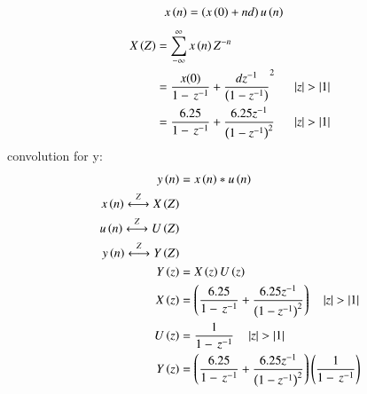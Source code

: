 \documentclass[journal,12pt,twocolumn]{IEEEtran}
\theoremstyle{remark}
\begin{document}
\begin{align}
x\left(n\right)&=\left(x\left(0\right)+nd\right)u\left(n\right)
\end{align}
\begin{align}
X\left(Z\right)&=\sum_{-\infty}^{\infty}x\left(n\right)Z^{-n}\\\
&=\frac{x(0)}{1-\,z^{-1}}+\frac{dz^{-1}}{\left(1-{z^{-1}}\right)}^2\:\:
\quad\left\vert z\right\vert>\left\vert1\right\vert\\
&=\frac{6.25}{1-\,z^{-1}}+\frac{6.25z^{-1}}{\left(1-{z^{-1}}\right)^2}\:\:\quad\left\vert z\right\vert>\left\vert1\right\vert
\end{align}
convolution for y:
\begin{align}
y\left(n\right)&=x\left(n\right)*u\left(n\right)\\
x\left(n\right)\overset{Z}{\longleftrightarrow}  X\left(Z\right)\\
u\left(n\right)\overset{Z}{\longleftrightarrow}  U\left(Z\right)\\
y\left(n\right)\overset{Z}{\longleftrightarrow}  Y\left(Z\right)\\
Y\left(z\right)&=X\left(z\right)U\left(z\right)\\
X\left(z\right)&=\left(\frac{6.25}{1-\,z^{-1}}+\frac{6.25z^{-1}}{\left(1-{z^{-1}}\right)^2}\right)\quad\left\vert z\right\vert>\left\vert1\right\vert\\
U\left(z\right)&=\frac{1}{1-\,z^{-1}}\quad\left\vert z\right\vert>\left\vert1\right\vert\\
Y\left(z\right)&=\left(\frac{6.25}{1-\,z^{-1}}+\frac{6.25z^{-1}}{\left(1-{z^{-1}}\right)^2}\right)\left(\frac{1}{1-\,z^{-1}}\right)
\end{align}
 
\end{document}
